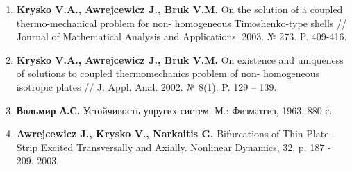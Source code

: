 \documentclass[12pt,letterpaper]{extreport}
\begin{document}

\begin{enumerate}

\item \textbf{Krysko V.A., Awrejcewicz J., Bruk 
V.M.} On the solution of a
coupled thermo-mechanical problem for non-
homogeneous Timoshenko-type shells //
Journal of Mathematical Analysis and Applications.
2003. № 273. P. 409-416.

\item \textbf{Krysko V.A., Awrejcewicz J., Bruk 
V.M.} On existence and 
uniqueness of solutions to coupled thermomechanics 
problem of non- homogeneous
isotropic plates // J. Appl. Anal. 2002. № 8(1). P. 
129 – 139.

\item \textbf{Вольмир А.С.} Устойчивость упругих 
систем. М.: Физматгиз, 1963,
880 с.

\item \textbf{Awrejcewicz J., Krysko V., Narkaitis 
G.} Bifurcations of Thin
Plate – Strip Excited Transversally and Axially. 
Nonlinear Dynamics, 32, p. 187
- 209, 2003.

\end{enumerate}
\end{document}

